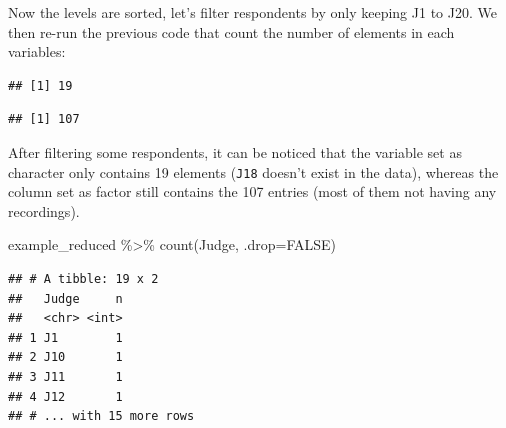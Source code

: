 \documentclass[
]{krantz}
\makeatletter
\newenvironment{Shaded}{\begin{snugshade}}{\end{snugshade}}
\newcommand{\AttributeTok}[1]{\textcolor[rgb]{0.61,0.61,0.61}{#1}}
\newcommand{\CommentTok}[1]{\textcolor[rgb]{0.37,0.37,0.37}{\textit{#1}}}
\newcommand{\ConstantTok}[1]{\textcolor[rgb]{0,0,0}{#1}}
\newcommand{\DecValTok}[1]{\textcolor[rgb]{0.06,0.06,0.06}{#1}}
\newcommand{\FunctionTok}[1]{\textcolor[rgb]{0,0,0}{#1}}
\newcommand{\NormalTok}[1]{#1}
\newcommand{\OtherTok}[1]{\textcolor[rgb]{0.37,0.37,0.37}{#1}}
\newcommand{\SpecialCharTok}[1]{\textcolor[rgb]{0,0,0}{#1}}
\newcommand{\StringTok}[1]{\textcolor[rgb]{0.5,0.5,0.5}{#1}}
\newenvironment{kframe}{%
\medskip{}
\setlength{\fboxsep}{.8em}
 \def\at@end@of@kframe{}%
 \ifinner\ifhmode%
  \def\at@end@of@kframe{\end{minipage}}%
  \begin{minipage}{\columnwidth}%
 \fi\fi%
 \def\FrameCommand##1{\hskip\@totalleftmargin \hskip-\fboxsep
 \colorbox{shadecolor}{##1}\hskip-\fboxsep
     \hskip-\linewidth \hskip-\@totalleftmargin \hskip\columnwidth}%
 \MakeFramed {\advance\hsize-\width
   \@totalleftmargin\z@ \linewidth\hsize
   \@setminipage}}%
 {\par\unskip\endMakeFramed%
 \at@end@of@kframe}
\renewenvironment{Shaded}{\begin{kframe}}{\end{kframe}}
\makeatother
\begin{document}
Now the levels are sorted, let's filter respondents by only keeping J1 to J20. We then re-run the previous code that count the number of elements in each variables:

\begin{Shaded}
\end{Shaded}

\begin{verbatim}
## [1] 19
\end{verbatim}

\begin{Shaded}
\end{Shaded}

\begin{verbatim}
## [1] 107
\end{verbatim}

After filtering some respondents, it can be noticed that the variable set as character only contains 19 elements (\texttt{J18} doesn't exist in the data), whereas the column set as factor still contains the 107 entries (most of them not having any recordings).

\begin{Shaded}
\begin{Highlighting}[]
\NormalTok{example\_reduced }\SpecialCharTok{\%\textgreater{}\%} 
  \FunctionTok{count}\NormalTok{(Judge, }\AttributeTok{.drop=}\ConstantTok{FALSE}\NormalTok{)}
\end{Highlighting}
\end{Shaded}

\begin{verbatim}
## # A tibble: 19 x 2
##   Judge     n
##   <chr> <int>
## 1 J1        1
## 2 J10       1
## 3 J11       1
## 4 J12       1
## # ... with 15 more rows
\end{verbatim}
\end{document}
